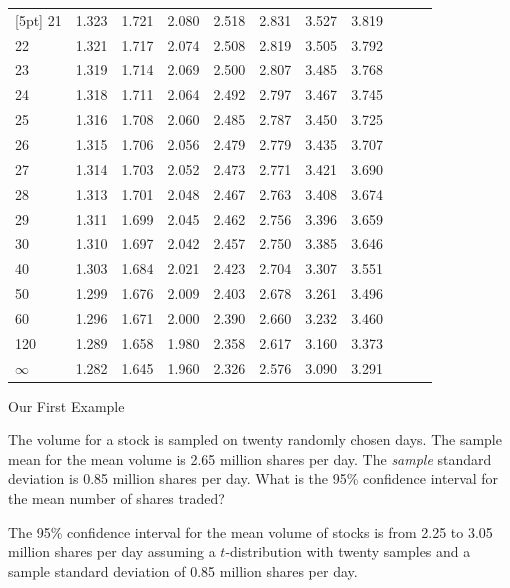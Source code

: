 \begin{frame}
{\begin{tabular}{l|ll>{\columncolor{blue}}llllllll}
[5pt]
21 & 1.323 & 1.721 & 2.080 & 2.518 & 2.831 & 3.527 & 3.819 \\ 
22 & 1.321 & 1.717 & 2.074 & 2.508 & 2.819 & 3.505 & 3.792 \\ 
23 & 1.319 & 1.714 & 2.069 & 2.500 & 2.807 & 3.485 & 3.768 \\ 
24 & 1.318 & 1.711 & 2.064 & 2.492 & 2.797 & 3.467 & 3.745 \\ 
25 & 1.316 & 1.708 & 2.060 & 2.485 & 2.787 & 3.450 & 3.725 \\ 
[5pt]
26 & 1.315 & 1.706 & 2.056 & 2.479 & 2.779 & 3.435 & 3.707 \\ 
27 & 1.314 & 1.703 & 2.052 & 2.473 & 2.771 & 3.421 & 3.690 \\ 
28 & 1.313 & 1.701 & 2.048 & 2.467 & 2.763 & 3.408 & 3.674 \\ 
29 & 1.311 & 1.699 & 2.045 & 2.462 & 2.756 & 3.396 & 3.659 \\ 
30 & 1.310 & 1.697 & 2.042 & 2.457 & 2.750 & 3.385 & 3.646 \\ 
[5pt]
40 & 1.303 & 1.684 & 2.021 & 2.423 & 2.704 & 3.307 & 3.551 \\ 
50 & 1.299 & 1.676 & 2.009 & 2.403 & 2.678 & 3.261 & 3.496 \\ 
60 & 1.296 & 1.671 & 2.000 & 2.390 & 2.660 & 3.232 & 3.460 \\ 
120 & 1.289 & 1.658 & 1.980 & 2.358 & 2.617 & 3.160 & 3.373 \\ 
$\infty$ & 1.282 & 1.645 & 1.960 & 2.326 & 2.576 & 3.090 & 3.291 
\end{tabular}


}

\end{frame}


\begin{frame}{Our First Example}

  The volume for a stock is sampled on twenty randomly chosen
  days. The sample mean for the mean volume is 2.65 million shares per
  day. The {\color{red}\textit{sample}} standard deviation is 0.85
  million shares per day. What is the 95\% confidence interval for the
  mean number of shares traded?

  \vfill

  {

    The 95\% confidence interval for the mean volume of stocks is from
    2.25 to 3.05 million shares per day assuming a $t$-distribution
    with twenty samples and a sample standard deviation of 0.85
    million shares per day.

  }


\end{frame}

